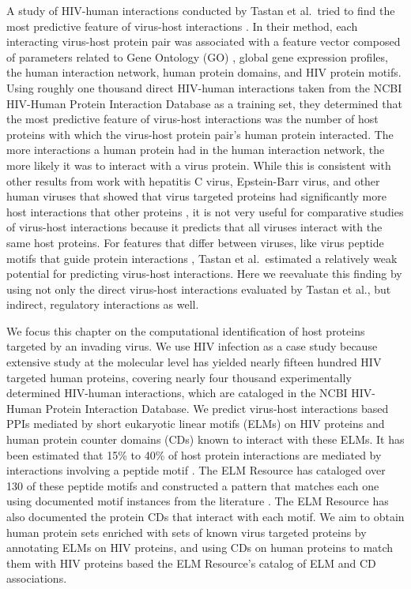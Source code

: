A study of HIV-human interactions conducted by Tastan et al.\ tried to
find the most predictive feature of virus-host interactions
\cite{tastan09}. In their method, each interacting virus-host protein
pair was associated with a feature vector composed of parameters
related to Gene Ontology (GO) \cite{ashburner00}, global gene
expression profiles, the human interaction network, human protein
domains, and HIV protein motifs. Using roughly one thousand direct
HIV-human interactions taken from the NCBI HIV-Human Protein
Interaction Database \cite{fu09,ptak08} as a training set, they
determined that the most predictive feature of virus-host interactions
was the number of host proteins with which the virus-host protein
pair's human protein interacted. The more interactions a human protein
had in the human interaction network, the more likely it was to
interact with a virus protein. While this is consistent with other
results from work with hepatitis C virus, Epstein-Barr virus, and
other human viruses that showed that virus targeted proteins had
significantly more host interactions that other proteins
\cite{calderwood07,dyer08,dechassey08}, it is not very useful for
comparative studies of virus-host interactions because it predicts
that all viruses interact with the same host proteins. For features
that differ between viruses, like virus peptide motifs that guide
protein interactions \cite{tonikian08,shelton08,kadaveru08}, Tastan et
al.\ estimated a relatively weak potential for predicting virus-host
interactions. Here we reevaluate this finding by using not only the
direct virus-host interactions evaluated by Tastan et al., but
indirect, regulatory interactions as well.

We focus this chapter on the computational identification of host
proteins targeted by an invading virus. We use HIV infection as a case
study because extensive study at the molecular level has yielded
nearly fifteen hundred HIV targeted human proteins, covering nearly
four thousand experimentally determined HIV-human interactions, which
are cataloged in the NCBI HIV-Human Protein Interaction Database. We
predict virus-host interactions based PPIs mediated by short
eukaryotic linear motifs (ELMs) \cite{puntervoll03} on HIV proteins
and human protein counter domains (CDs) known to interact with these
ELMs. It has been estimated that 15\% to 40\% of host protein
interactions are mediated by interactions involving a peptide motif
\cite{ceol2006domino,neduva2006peptides,petsalaki2008peptide}. The ELM
Resource has cataloged over 130 of these peptide motifs and
constructed a pattern that matches each one using documented motif
instances from the literature \cite{puntervoll03}. The ELM Resource
has also documented the protein CDs that interact with each motif. We
aim to obtain human protein sets enriched with sets of known virus
targeted proteins by annotating ELMs on HIV proteins, and using CDs on
human proteins to match them with HIV proteins based the ELM
Resource's catalog of ELM and CD associations.

